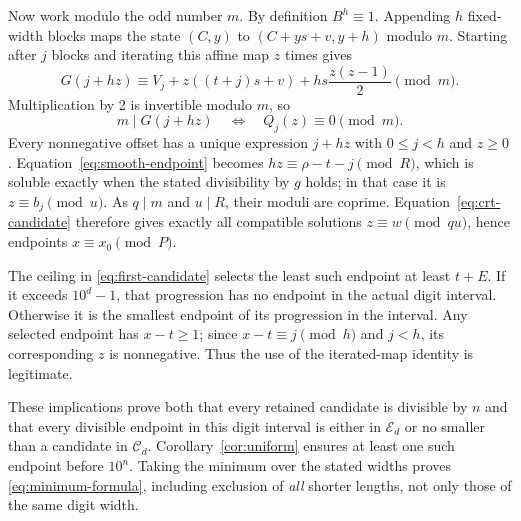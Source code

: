 Now work modulo the odd number $m$. By definition $B^h\equiv1$.
Appending $h$ fixed-width blocks maps the state $(C,y)$ to
$(C+ys+v,y+h)$ modulo $m$. Starting after $j$ blocks and iterating this
affine map $z$ times gives
\[
 G(j+hz)\equiv V_j+z((t+j)s+v)+hs\frac{z(z-1)}2\pmod m.
\]
Multiplication by 2 is invertible modulo $m$, so
\begin{equation}\label{eq:quadratic-equivalence}
 m\mid G(j+hz)\quad\Longleftrightarrow\quad Q_j(z)\equiv0\pmod m.
\end{equation}
Every nonnegative offset has a unique expression $j+hz$ with
$0\le j<h$ and $z\ge0$. Equation~\eqref{eq:smooth-endpoint} becomes
$hz\equiv\rho-t-j\pmod R$, which is soluble exactly when the
stated divisibility by $g$ holds; in that case it is $z\equiv b_j\pmod u$.
As $q\mid m$ and $u\mid R$, their moduli are coprime.
Equation~\eqref{eq:crt-candidate} therefore gives exactly all compatible
solutions $z\equiv w\pmod{qu}$, hence endpoints $x\equiv x_0\pmod P$.

The ceiling in \eqref{eq:first-candidate} selects the least such endpoint
at least $t+E$. If it exceeds $10^d-1$, that progression has no endpoint
in the actual digit interval. Otherwise it is the smallest endpoint of
its progression in the interval. Any selected endpoint has $x-t\ge1$;
since $x-t\equiv j\pmod h$ and $j<h$, its corresponding $z$ is nonnegative.
Thus the use of the iterated-map identity is legitimate.

These implications prove both that every retained candidate is divisible
by $n$ and that every divisible endpoint in this digit interval is either
in $\mathcal E_d$ or no smaller than a candidate in $\mathcal C_d$.
Corollary~\ref{cor:uniform} ensures at least one such endpoint before
$10^n$. Taking the minimum over the stated widths proves
\eqref{eq:minimum-formula}, including exclusion of \emph{all} shorter
lengths, not only those of the same digit width.

